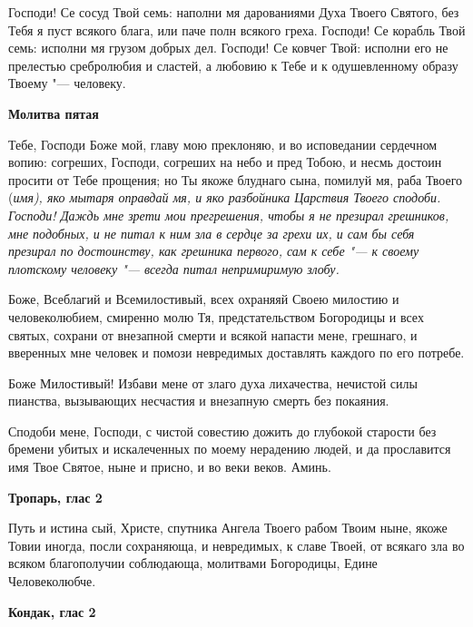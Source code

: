 Господи! Се сосуд Твой семь: наполни мя дарованиями Духа Твоего Святого, без Тебя я пуст всякого блага, или паче полн всякого греха. Господи! Се корабль Твой семь: исполни мя грузом добрых дел. Господи! Се ковчег Твой: исполни его не прелестью сребролюбия и сластей, а любовию к Тебе и к одушевленному образу Твоему "--- человеку.


\medskip\bfseries Молитва пятая\normalfont{}\nopagebreak

Тебе, Господи Боже мой, главу мою преклоняю, и во исповедании сердечном вопию: согреших, Господи, согреших на небо и пред Тобою, и несмь достоин просити от Тебе прощения; но Ты якоже блуднаго сына, помилуй мя, раба Твоего (\itshape имя\normalfont{}), яко мытаря оправдай мя, и яко разбойника Царствия Твоего сподоби. Господи! Даждь мне зрети мои прегрешения, чтобы я не презирал грешников, мне подобных, и не питал к ним зла в сердце за грехи их, и сам бы себя презирал по достоинству, как грешника первого, сам к себе "--- к своему плотскому человеку "--- всегда питал непримиримую злобу.
\longpage{}\mychapterending

 


Боже, Всеблагий и Всемилостивый, всех охраняяй Своею милостию и человеколюбием, смиренно молю Тя, предстательством Богородицы и всех святых, сохрани от внезапной смерти и всякой напасти мене, грешнаго, и вверенных мне человек и помози невредимых доставлять каждого по его потребе.


Боже Милостивый! Избави мене от злаго духа лихачества, нечистой силы пианства, вызывающих несчастия и внезапную смерть без покаяния.


Сподоби мене, Господи, с чистой совестию дожить до глубокой старости без бремени убитых и искалеченных по моему нерадению людей, и да прославится имя Твое Святое, ныне и присно, и во веки веков. Аминь.
\mychapterending

 


\medskip\bfseries Тропарь, глас 2\normalfont{}\nopagebreak


Путь и истина сый, Христе, спутника Ангела Твоего рабом Твоим ныне, якоже Товии иногда, посли сохраняюща, и невредимых, к славе Твоей, от всякаго зла во всяком благополучии соблюдающа, молитвами Богородицы, Едине Человеколюбче. 


\medskip\bfseries Кондак, глас 2\normalfont{}\nopagebreak


